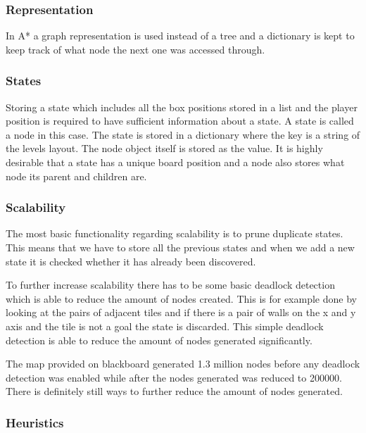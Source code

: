 \documentclass[../../maint.tex]{subfiles}
\begin{document}
\subsubsection{Representation}

In A* a graph representation is used instead of a tree and a dictionary is kept to keep track of what node the next one was accessed through.

\subsubsection{States}

Storing a state which includes all the box positions stored in a list and the player position is required to have 				sufficient 	information about a state. A state is called a node in this case. The state is stored in a dictionary where 		the key is a string of the levels layout. The node object itself is stored as the value. It is highly desirable that a 			state has a unique board position and a node also stores what node its parent and children are. 

\subsubsection{Scalability}

The most basic functionality regarding scalability is to prune duplicate states. This means that we have to store all the 		previous states and when we add a new state it is checked whether it has already been discovered.
	
	
To further increase scalability there has to be some basic deadlock detection which is able to reduce the amount of nodes 		created. This is for example done by looking at the pairs of adjacent tiles and if there is a pair of walls on the x and y 	axis and the tile is not a goal the state is discarded. This simple deadlock detection is able to reduce the amount of 			nodes generated significantly. 
	
The map provided on blackboard generated 1.3 million nodes before any deadlock detection was enabled while after the nodes 	generated was reduced to 200000. There is definitely still ways to further reduce the amount of nodes generated.

\subsubsection{Heuristics}
\end{document}
